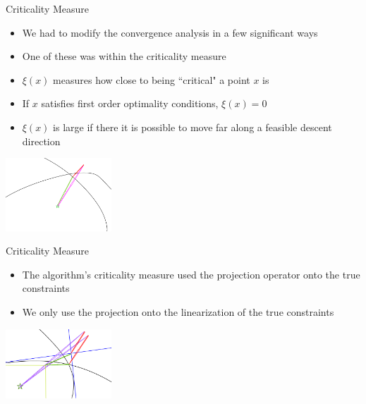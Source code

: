 \documentclass{beamer}
\begin{document}
\begin{frame}{Criticality Measure}
	\begin{itemize}
		\item We had to modify the convergence analysis in a few significant ways
		\item One of these was within the criticality measure
		\item $\xi(x)$ measures how close to being ``critical" a point $x$ is
		\item If $x$ satisfies first order optimality conditions, $\xi(x) = 0$
		\item $\xi(x)$ is large if there it is possible to move far along a feasible descent direction
	\end{itemize}
	\begin{center}
		\includegraphics[width=150px]{images/criticality.png}
	\end{center}
\end{frame}



\begin{frame}{Criticality Measure}
	\begin{itemize}
		\item The algorithm's criticality measure used the projection operator onto the true constraints
		\item We only use the projection onto the linearization of the true constraints
	\end{itemize}
	\begin{center}
		\includegraphics[width=150px]{images/criticality_measure.png}
	\end{center}
\end{frame}
\end{document}
